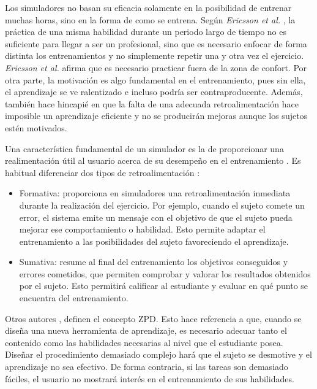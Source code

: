 Los simuladores no basan su eficacia solamente en la posibilidad de entrenar muchas horas, sino en la forma de como se entrena. Según \emph{Ericsson et al.} \cite{ericsson1993role}, la práctica de una misma habilidad durante un periodo largo de tiempo no es suficiente para llegar a ser un profesional, sino que es necesario enfocar de forma distinta los entrenamientos y no simplemente repetir una y otra vez el ejercicio. \emph{Ericsson et al.} afirma que es necesario practicar fuera de la zona de confort. Por otra parte, la motivación es algo fundamental en el entrenamiento, pues sin ella, el aprendizaje se ve ralentizado e incluso podría ser contraproducente. Además, también hace hincapié en que la falta de una adecuada retroalimentación hace imposible un aprendizaje eficiente y no se producirán mejoras aunque los sujetos estén motivados. 

Una característica fundamental de un simulador es la de proporcionar una realimentación útil al usuario acerca de su desempeño en el entrenamiento \cite{ericsson1993role}. Es habitual diferenciar dos tipos de retroalimentación \cite{Sando2013}: 
\begin{itemize}
    \item Formativa: proporciona en simuladores una retroalimentación inmediata durante la realización del ejercicio. Por ejemplo, cuando el sujeto comete un error, el sistema emite un mensaje con el objetivo de que el sujeto pueda mejorar ese comportamiento o habilidad.  Esto permite adaptar el entrenamiento a las posibilidades del sujeto favoreciendo el aprendizaje. %
    \item Sumativa: resume al final del entrenamiento los objetivos conseguidos y errores cometidos, que permiten comprobar y valorar los resultados obtenidos por el sujeto. Esto permitirá calificar al estudiante y evaluar en qué punto se encuentra del entrenamiento.
\end{itemize}


Otros autores \cite{zpd}, definen el concepto \ac{ZPD}. Esto hace referencia a que, cuando se diseña una nueva herramienta de aprendizaje, es necesario adecuar tanto el contenido como las habilidades necesarias al nivel que el estudiante posea. Diseñar el procedimiento demasiado complejo hará que el sujeto se desmotive y el aprendizaje no sea efectivo. De forma contraria, si las tareas son demasiado fáciles, el usuario no mostrará interés en el entrenamiento de sus habilidades.


